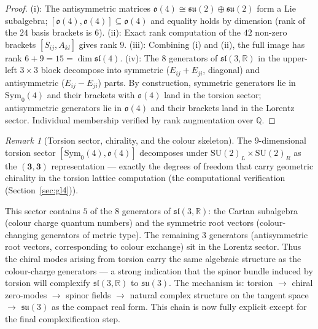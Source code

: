 \documentclass[11pt,a4paper]{article}
\theoremstyle{plain}
\theoremstyle{definition}
\theoremstyle{remark}
\newtheorem{remark}[theorem]{Remark}
\begin{document}
\begin{proof}
(i): The antisymmetric matrices $\mathfrak{o}(4) \cong \mathfrak{su}(2)\oplus\mathfrak{su}(2)$ form a Lie subalgebra;
$[\mathfrak{o}(4),\mathfrak{o}(4)]\subseteq\mathfrak{o}(4)$ and equality holds by dimension (rank of the $24$ basis brackets is $6$).
(ii): Exact rank computation of the $42$ non-zero brackets $[S_{ij},A_{kl}]$ gives rank $9$.
(iii): Combining (i) and (ii), the full image has rank $6+9=15 = \dim\mathfrak{sl}(4)$.
(iv): The $8$ generators of $\mathfrak{sl}(3,\mathbb{R})$ in the upper-left 
$3\times 3$ block decompose into symmetric ($E_{ij}+E_{ji}$, diagonal) and 
antisymmetric ($E_{ij}-E_{ji}$) parts.  By construction, symmetric generators 
lie in $\mathrm{Sym}_0(4)$ and their brackets with $\mathfrak{o}(4)$ land in 
the torsion sector; antisymmetric generators lie in $\mathfrak{o}(4)$ and their 
brackets land in the Lorentz sector.  Individual membership verified by rank 
augmentation over $\mathbb{Q}$.
\end{proof}

\begin{remark}[Torsion sector, chirality, and the colour skeleton]
The $9$-dimensional torsion sector $[\mathrm{Sym}_0(4),\mathfrak{o}(4)]$ decomposes under $\mathrm{SU}(2)_L\times\mathrm{SU}(2)_R$
as the $(\mathbf{3},\mathbf{3})$ representation --- exactly the degrees of freedom that carry geometric chirality
in the torsion lattice computation (the computational verification (Section~\ref{sec:gl4})).

This sector contains $5$ of the $8$ generators of $\mathfrak{sl}(3,\mathbb{R})$:
the Cartan subalgebra (colour charge quantum numbers) and the symmetric root
vectors (colour-changing generators of metric type).  The remaining $3$ generators
(antisymmetric root vectors, corresponding to colour exchange) sit in the Lorentz
sector.  Thus the chiral modes arising from torsion carry the same algebraic
structure as the colour-charge generators --- a strong indication that the spinor
bundle induced by torsion will complexify $\mathfrak{sl}(3,\mathbb{R})$ to
$\mathfrak{su}(3)$.  The mechanism is:
torsion $\to$ chiral zero-modes $\to$ spinor fields $\to$ natural complex
structure on the tangent space $\to$ $\mathfrak{su}(3)$ as the compact real form.
This chain is now fully explicit except for the final complexification step.
\end{remark}
\end{document}
